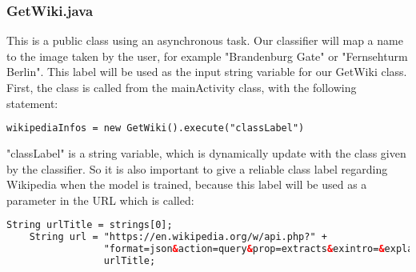 \subsubsection{GetWiki.java}
This is a public class using an asynchronous task. Our classifier will map a name to the image taken by the user, for example "Brandenburg Gate" or "Fernsehturm Berlin". This label will be used as the input string variable for our GetWiki class.\\
First, the class is called from the mainActivity class, with the following statement:

\begin{lstlisting}[language=XML, basicstyle=\scriptsize]
    wikipediaInfos = new GetWiki().execute("classLabel")
\end{lstlisting}

"classLabel" is a string variable, which is dynamically update with the class given by the classifier. So it is also important to give a reliable class label regarding Wikipedia when the model is trained, because this label will be used as a parameter in the URL which is called:
\begin{lstlisting}[language=XML, basicstyle=\scriptsize]
    String urlTitle = strings[0];
    String url = "https://en.wikipedia.org/w/api.php?" +
                 "format=json&action=query&prop=extracts&exintro=&explaintext=&titles=" +
                 urlTitle;
\end{lstlisting}


